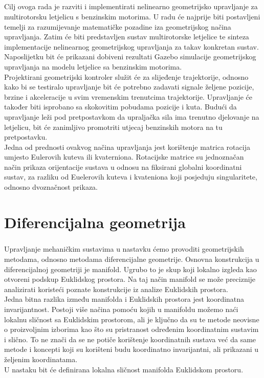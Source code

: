 \documentclass[times, utf8, diplomski, numeric]{fer}
\begin{document}
\paragraph{}
Cilj ovoga rada je razviti i implementirati nelinearno geometrijsko upravljanje za multirotorsku letjelicu s benzinskim motorima. U radu će najprije biti postavljeni temelji za razumijevanje matematičke pozadine iza geometrijskog načina upravljanja. Zatim će biti predstavljen sustav multirotorske letjelice te sinteza implementacije nelinearnog geometrijskog upravljanja za takav konkretan sustav. Naposlijetku bit će prikazani dobiveni rezultati Gazebo simulacije geometrijskog upravljanja na modelu letjelice sa benzinskim motorima. \\
Projektirani geometrijski kontroler služit će za slijeđenje trajektorije, odnosno kako bi se testiralo upravljanje bit će potrebno zadavati signale željene pozicije, brzine i akceleracije u svim vremenskim trenutcima trajektorije. Upravljanje će također biti isprobano sa skokovitim pobudama pozicije i kuta. Budući da upravljanje leži pod pretpostavkom da upraljačka sila ima trenutno djelovanje na letjelicu, bit će zanimljivo promotriti utjecaj benzinskih motora na tu pretpostavku. \\
Jedna od prednosti ovakvog načina upravljanja jest korištenje matrica rotacija umjesto Eulerovih kuteva ili kvaterniona. Rotacijske matrice su jednoznačan način prikaza orijentacije sustava u odnosu na fiksirani globalni koordinatni sustav, za razliku od Euelerovih kuteva i kvateniona koji posjeduju singularitete, odnosno dvoznačnost prikaza.

\newpage 
\clearpage

\chapter{Diferencijalna geometrija}

	\paragraph{} Upravljanje mehaničkim sustavima u nastavku ćemo provoditi geometrijskih metodama, odnosno metodama diferencijalne geometrije. Osnovna konstrukcija u diferencijalnoj geometriji je manifold. Ugrubo to je skup koji lokalno izgleda kao otvoreni podskup Euklidskog prostora. Na taj način manifold se može preciznije analizirati koristeći poznate konstrukcije iz analize Euklidskih prostora. \\ 
	Jedna bitna razlika između manifolda i Euklidskih prostora jest koordinatna invarijantnost. Postoji više načina pomoću kojih u manifoldu možemo naći lokalnu sličnost sa Euklidskim prostorom, ali je ključno da su te metode neovisne o proizvoljnim izborima kao što su pristranost određenim koordinatnim sustavim i slično. To ne znači da se ne potiče korištenje koordinatnih sustava već da same metode i koncepti koji su korišteni budu koordinatno invarijantni, ali prikazani u željenim koordinatama. \\
	U nastaku bit će definirana lokalna sličnost manifolda Euklidskom prostoru.
\end{document}
